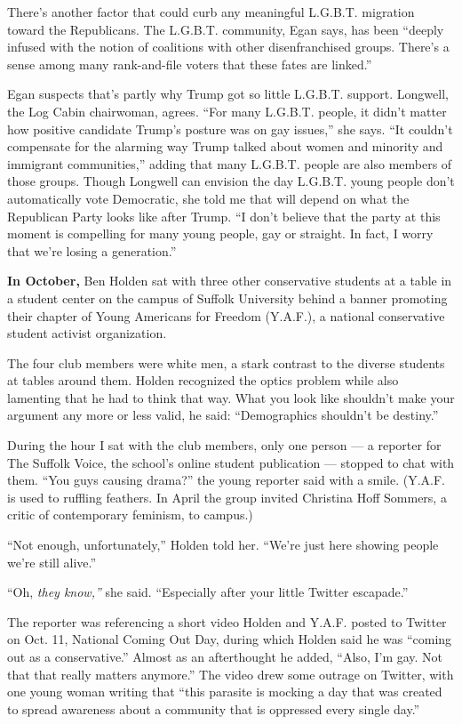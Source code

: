 There's another factor that could curb any meaningful L.G.B.T. migration
toward the Republicans. The L.G.B.T. community, Egan says, has been
``deeply infused with the notion of coalitions with other
disenfranchised groups. There's a sense among many rank-and-file voters
that these fates are linked.''

Egan suspects that's partly why Trump got so little L.G.B.T. support.
Longwell, the Log Cabin chairwoman, agrees. ``For many L.G.B.T. people,
it didn't matter how positive candidate Trump's posture was on gay
issues,'' she says. ``It couldn't compensate for the alarming way Trump
talked about women and minority and immigrant communities,'' adding that
many L.G.B.T. people are also members of those groups. Though Longwell
can envision the day L.G.B.T. young people don't automatically vote
Democratic, she told me that will depend on what the Republican Party
looks like after Trump. ``I don't believe that the party at this moment
is compelling for many young people, gay or straight. In fact, I worry
that we're losing a generation.''

\textbf{In October,} Ben Holden sat with three other conservative
students at a table in a student center on the campus of Suffolk
University behind a banner promoting their chapter of Young Americans
for Freedom (Y.A.F.), a national conservative student activist
organization.

The four club members were white men, a stark contrast to the diverse
students at tables around them. Holden recognized the optics problem
while also lamenting that he had to think that way. What you look like
shouldn't make your argument any more or less valid, he said:
``Demographics shouldn't be destiny.''

During the hour I sat with the club members, only one person --- a
reporter for The Suffolk Voice, the school's online student publication
--- stopped to chat with them. ``You guys causing drama?'' the young
reporter said with a smile. (Y.A.F. is used to ruffling feathers. In
April the group invited Christina Hoff Sommers, a critic of contemporary
feminism, to campus.)

``Not enough, unfortunately,'' Holden told her. ``We're just here
showing people we're still alive.''

``Oh, \emph{they know,''} she said. ``Especially after your little
Twitter escapade.''

The reporter was referencing a short video Holden and Y.A.F. posted to
Twitter on Oct. 11, National Coming Out Day, during which Holden said he
was ``coming out as a conservative.'' Almost as an afterthought he
added, ``Also, I'm gay. Not that that really matters anymore.'' The
video drew some outrage on Twitter, with one young woman writing that
``this parasite is mocking a day that was created to spread awareness
about a community that is oppressed every single day.''

